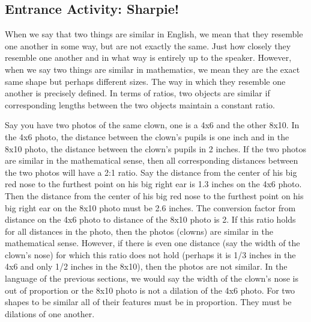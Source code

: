 \wbnewpage
\subsection{Entrance Activity: Sharpie!}
When we say that two things are similar in English, we mean that they resemble one another in some way, but are not exactly the same. Just how closely they resemble one another and in what way is entirely up to the speaker. However, when we say two things are similar in mathematics, we mean they are the exact same shape but perhaps different sizes. The way in which they resemble one another is precisely defined. In terms of ratios, two objects are similar if corresponding lengths between the two objects maintain a constant ratio.

Say you have two photos of the same clown, one is a 4x6 and the other 8x10. In the 4x6 photo, the distance between the clown's pupils is one inch and in the 8x10 photo, the distance between the clown's pupils in 2 inches. If the two photos are similar in the mathematical sense, then all corresponding distances between the two photos will have a 2:1 ratio. Say the distance from the center of his big red nose to the furthest point on his big right ear is 1.3 inches on the 4x6 photo. Then the distance from the center of his big red nose to the furthest point on his big right ear on the 8x10 photo must be 2.6 inches. The conversion factor from distance on the 4x6 photo to distance of the 8x10 photo is 2. If this ratio holds for all distances in the photo, then the photos (clowns) are similar in the mathematical sense. However, if there is even one distance (say the width of the clown's nose) for which this ratio does not hold (perhaps it is 1/3 inches in the 4x6 and only 1/2 inches in the 8x10), then the photos are not similar. In the language of the previous sections, we would say the width of the clown's nose is out of proportion or the 8x10 photo is not a dilation of the 4x6 photo. For two shapes to be similar all of their features must be in proportion. They must be dilations of one another.


